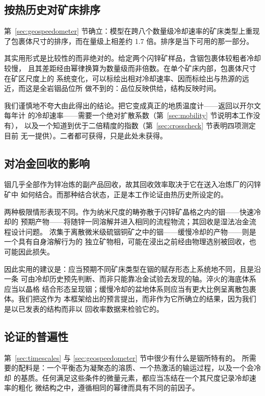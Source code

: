 \documentclass[11pt,a4paper]{ctexart}
\begin{document}
\subsection{按热历史对矿床排序}

第~\ref{sec:geospeedometer} 节确立：模型在跨八个数量级冷却速率的矿床类型上重现
了包裹体尺寸的排序，而在量级上相差约 1.7 倍。排序是当下可用的那一部分。

其实用形式是比较性的而非绝对的。给定两个闪锌矿样品，含铟包裹体较粗者冷却较慢，
且其差距经由幂律换算为数量级而非倍数。在单个矿床内部，包裹体尺寸在矿区尺度上的
系统变化，可以标绘出相对冷却速率、因而标绘出与热源的远近，而这是全岩铟品位所
做不到的：品位反映供给，结构反映时间。

我们谨慎地不夸大由此得出的结论。把它变成真正的地质温度计——返回以开尔文每年计
的冷却速率——需要一个绝对扩散系数（第~\ref{sec:mobility} 节说明本工作没有），
以及一个知道到优于二倍精度的指数（第~\ref{sec:crosscheck} 节表明四项测定目前
无一提供）。二者都可获得，只是此处未获得。

\subsection{对冶金回收的影响}

铟几乎全部作为锌冶炼的副产品回收，故其回收效率取决于它在送入冶炼厂的闪锌矿中
如何结合。而那种结合状态，正是本工作论证由热历史所设定的。

两种极限情形表现不同。作为纳米尺度的畴弥散于闪锌矿晶格之内的铟——快速冷却的
预期产物——将随锌一同溶解并进入相同的流程物流；其回收是湿法冶金流程设计问题。
浓集于离散微米级硫铟铜矿之中的铟——缓慢冷却的产物——则是一个具有自身溶解行为的
独立矿物相，可能在浸出之前经由物理选别被回收，也可能因此损失。

因此实用的建议是：应当预期不同矿床类型在铟的赋存形态上系统地不同，且是沿一条
可由冷却历史预先判断、而非只能靠冶金试验去发现的轴。淬火的海底体系应当以晶格
结合形态呈现铟；缓慢冷却的盆地体系则应当有更大比例呈离散包裹体。我们把这作为
本框架给出的预言提出，而非作为它所确立的结果，因为我们是以已发表的结构而非以
回收率数据来检验它的。

\subsection{论证的普遍性}

第~\ref{sec:timescales} 与 \ref{sec:geospeedometer} 节中很少有什么是铟所特有的。
所需要的配料是：一个平衡态为凝聚态的溶质、一个热激活的输运过程，以及一个会冷却
的基质。任何满足这些条件的微量元素，都应当冻结在一个其尺度记录冷却速率的粗化
微结构之中，遵循相同的幂律而具有不同的前因子。
\end{document}
